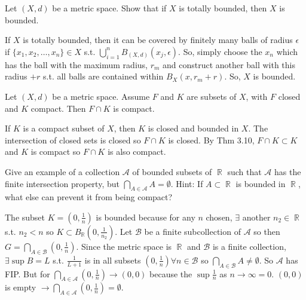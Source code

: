 \documentclass[12pt,letterpaper,boxed]{hmcpset}
\DeclareMathOperator{\R}{\mathbb{R}}
\begin{document}

\begin{problem}[Exercise 2.24]
Let $(X, d)$ be a metric space. Show that if $X$ is totally bounded, then $X$ is bounded.
\end{problem}

\begin{solution}
If $X$ is totally bounded, then it can be covered by finitely many balls of radius $\epsilon$ if $\{x_1, x_2, \dots, x_n\} \in X$ s.t. $\bigcup_{i = 1}^{n} B_{(X, d)}(x_j, \epsilon)$. So, simply choose the $x_n$ which has the ball with the maximum radius, $r_m$ and construct another ball with this radius $ + r$ s.t. all balls are contained within $B_X(x, r_m + r)$. So, $X$ is bounded.
\end{solution}

\begin{problem}[Exercise 3.12]
Let $(X, d)$ be a metric space. Assume $F$ and $K$ are subsets of $X$, with $F$ closed and $K$ compact. Then $F\cap K$ is compact.
\end{problem}

\begin{solution}
If $K$ is a compact subset of $X$, then $K$ is closed and bounded in $X$. The intersection of closed sets is closed so $F\cap K$ is closed. By Thm 3.10, $F \cap K \subset K$ and $K$ is compact so $F \cap K$ is also compact.
\end{solution}

\begin{problem}[Exercise 3.26]
Give an example of a collection $\mathcal{A}$ of bounded subsets of $\R$ such that $\mathcal{A}$ has the finite intersection property, but $\bigcap_{A \in \mathcal{A}} A = \emptyset$. Hint: If $A \subset \R$ is bounded in $\R$, what else can prevent it from being compact?
\end{problem}

\begin{solution}
The subset $K=(0, \frac{1}{n})$ is bounded because for any $n$ chosen, $\exists$ another $n_2 \in \R$ s.t. $n_2 < n$ so $K \subset B_{\R} (0, \frac{1}{n_2})$. Let $\mathcal{B}$ be a finite subcollection of $\mathcal{A}$ so then $G = \bigcap_{A\in \mathcal{B}} (0, \frac{1}{n})$. Since the metric space is $\R$ and $\mathcal{B}$ is a finite collection, $\exists \sup B = L$ s.t. $\frac{1}{L + 1}$ is in all subsets $(0, \frac{1}{n}) \forall n \in \mathcal{B}$ so $\bigcap_{A \in \mathcal{B}}A \neq \emptyset.$ So $\mathcal{A}$ has FIP. But for $\bigcap_{A \in \mathcal{A}}(0, \frac{1}{n}) \rightarrow (0, 0)$ because the $\sup \frac{1}{n}$ as $n\rightarrow\infty = 0.$ $(0, 0)$ is empty $\rightarrow \bigcap_{A \in \mathcal{A}}(0, \frac{1}{n}) = \emptyset.$
\end{solution}
\end{document}
